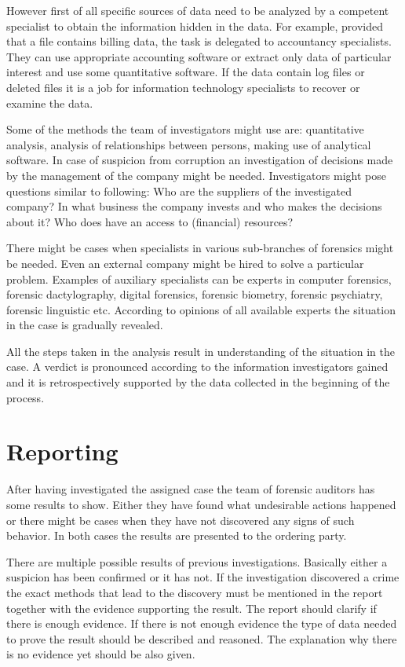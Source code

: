 However first of all specific sources of data need to be analyzed by a competent specialist to obtain the information hidden in the data. For example, provided that a file contains billing data, the task is delegated to accountancy specialists. They can use appropriate accounting software or extract only data of particular interest and use some quantitative software. If the data contain log files or deleted files it is a job for information technology specialists to recover or examine the data. 


Some of the methods the team of investigators might use are: quantitative analysis, analysis of relationships between persons, making use of analytical software.  In case of  suspicion from corruption an investigation of decisions made by the management of the company might be needed. Investigators might pose questions similar to following: Who are the suppliers of the investigated company? In what business the company invests and who makes the decisions about it? Who does have an access to (financial) resources?


There might be cases when specialists in various sub-branches of forensics might be needed. Even an external company might be hired to solve a particular problem. Examples of auxiliary specialists can be experts in computer forensics, forensic dactylography, digital forensics, forensic biometry, forensic psychiatry, forensic linguistic etc. According to opinions of all available experts the situation in the case is gradually revealed.

All the steps taken in the analysis result in understanding of the situation in the case. A verdict is pronounced according to the information investigators gained and it is retrospectively supported by the data collected in the beginning of the process. 


\section{Reporting}

After having investigated the assigned case the team of forensic auditors has some results to show. Either they have found what undesirable actions happened or there might be cases when they have not discovered any signs of such behavior. In both cases the results are presented to the ordering party. 


There are multiple possible results of previous investigations. Basically either a suspicion has been confirmed or it has not. If the investigation discovered a crime the exact methods that lead to the discovery must be mentioned in the report together with the evidence supporting the result. The report should clarify if there is enough evidence. If there is not enough evidence the type of data needed to prove the result should be described and reasoned. The explanation why there is no evidence yet should be also given.


